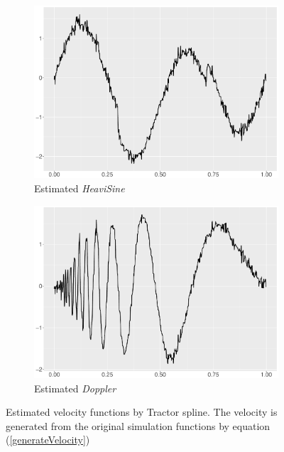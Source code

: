 \begin{figure}
\begin{subfigure}{0.45\textwidth}
    \includegraphics[width=\textwidth]{Chapters/02TractorSplineTheory/plot/ggplot/ggHeaviSineTractorVelocity.pdf}
    \caption{Estimated \textit{HeaviSine}  }
    \end{subfigure}
    \begin{subfigure}{0.45\textwidth}
    \centering
    \includegraphics[width=\textwidth]{Chapters/02TractorSplineTheory/plot/ggplot/ggDopplerTractorVelocity.pdf}
    \caption{Estimated \textit{Doppler}  }
    \end{subfigure}
\caption{Estimated velocity functions by Tractor spline. The velocity is generated from the original simulation functions by equation (\ref{generateVelocity})}\label{numvtractor}
 \end{figure}



